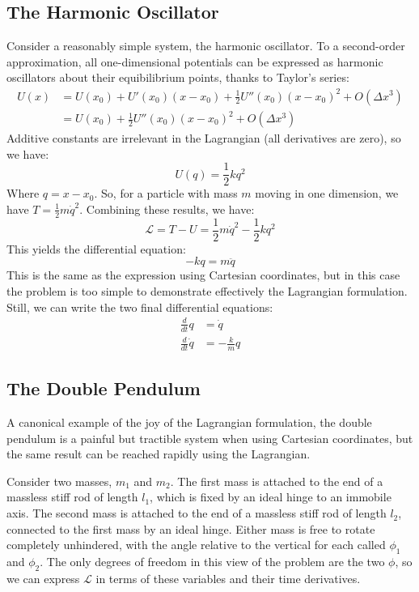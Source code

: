 \documentclass{article}
\newcommand{\lagrangian}{\ensuremath{\mathcal{L}}}
\newcommand{\ddt}{\frac{d}{dt}}
\begin{document}
\subsection{The Harmonic Oscillator}
Consider a reasonably simple system, the harmonic oscillator. To a second-order approximation, all one-dimensional potentials can be expressed as harmonic oscillators about their equibilibrium points, thanks to Taylor's series:
\begin{align}
 U(x) &= U(x_{0}) + U'(x_{0})(x-x_{0}) + \frac{1}{2}U''(x_{0})(x-x_{0})^{2} + O(\Delta x^{3}) \nonumber \\
      &= U(x_{0}) + \frac{1}{2}U''(x_{0})(x-x_{0})^{2} + O(\Delta x^{3})
\end{align}
Additive constants are irrelevant in the Lagrangian (all derivatives are zero), so we have:
\begin{equation}
 U(q) = \frac{1}{2}kq^{2}
\end{equation}
Where $q=x-x_{0}$. So, for a particle with mass $m$ moving in one dimension, we have $T=\frac{1}{2}m\dot{q}^2$. Combining these results, we have:
\begin{equation}
 \lagrangian = T-U = \frac{1}{2}m\dot{q}^{2} - \frac{1}{2}kq^{2}
\end{equation}
This yields the differential equation:
\begin{equation}
 -kq = m\ddot{q}
\end{equation}
This is the same as the expression using Cartesian coordinates, but in this case the problem is too simple to demonstrate effectively the Lagrangian formulation. Still, we can write the two final differential equations:
\begin{align}
 \ddt q &= \dot{q} \\
 \ddt \dot{q} &= -\frac{k}{m}q
\end{align}

\subsection{The Double Pendulum}
A canonical example of the joy of the Lagrangian formulation, the double pendulum is a painful but tractible system when using Cartesian coordinates, but the same result can be reached rapidly using the Lagrangian.

Consider two masses, $m_{1}$ and $m_{2}$. The first mass is attached to the end of a massless stiff rod of length $l_{1}$, which is fixed by an ideal hinge to an immobile axis. The second mass is attached to the end of a massless stiff rod of length $l_{2}$, connected to the first mass by an ideal hinge. Either mass is free to rotate completely unhindered, with the angle relative to the vertical for each called $\phi_{1}$ and $\phi_{2}$. The only degrees of freedom in this view of the problem are the two $\phi$, so we can express \lagrangian{} in terms of these variables and their time derivatives.
\end{document}
